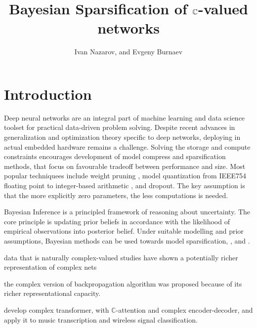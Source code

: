 \documentclass[a4paper,10pt]{article}
\title{Bayesian Sparsification of $\cplx$-valued networks}
\author{Ivan Nazarov, and Evgeny Burnaev}
\newcommand{\cplx}{\mathbb{C}}
\begin{document}
\maketitle

\section{Introduction} %
\label{sec:introduction}

Deep neural networks are an integral part of machine learning and data science toolset
for practical data-driven problem solving. Despite recent advances in generalization
and optimization theory specific to deep networks, deploying in actual embedded hardware
remains a challenge. Solving the storage and compute constraints encourages development
of model compress and sparsification methods, that focus on favourable tradeoff between
performance and size. Most popular techniquees include weight pruning \cite{citation_needed},
model quantization from IEEE754 floating point to integer-based arithmetic \cite{citation_needed},
and dropout. The key assumption is that the more explicitly zero parameters, the less
computations is needed.

Bayesian Inference is a principled framework of reasoning about uncertainty. The core principle
is updating prior beliefs in accordance with the likelihood of empirical observations into
posterior belief. Under suitable modelling and prior assumptions, Bayesian methods can be
used towards model sparsification, \cite{kingma_variational_2015,molchanov_variational_2017},
and \cite{kharitonov_variational_2018}.

data that is naturally complex-valued
studies have shown a potentially richer representation of complex nets
\cite{hirose2003,fijulamin2009}

the complex version of backpropagation algorithm  was proposed because of
its richer representational capacity.


\cite{yang_complex_2019} develop complex transformer, with $\cplx$-attention and complex
encoder-decoder, and apply it to music transcription and wireless signal classification.
\end{document}
